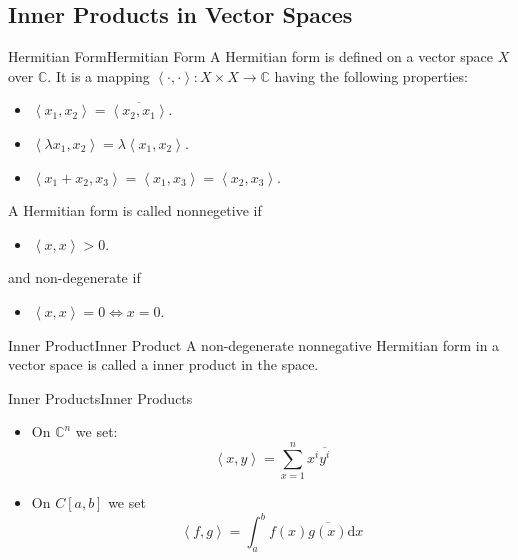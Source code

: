 \documentclass[../main.tex]{subfiles}
\begin{document}
\subsection{Inner Products in Vector Spaces}

\begin{definition}{Hermitian Form}{Hermitian Form}
A Hermitian form is defined on a vector space $X$ over $\mathbb{C}$. It is a mapping $\left<\cdot ,\cdot \right>: X \times X \rightarrow  \mathbb{C}$ having the following properties:
\begin{itemize}
\item $\left<x_1,x_2\right> = \overline{\left<x_2,x_1\right>}$.
\item $\left<\lambda x_1,x_2\right> = \lambda \left<x_1,x_2\right>$.
\item $\left<x_1+x_2,x_3\right> = \left<x_1,x_3\right> = \left<x_2,x_3\right>$.
\end{itemize}

A Hermitian form is called nonnegetive if
\begin{itemize}
\item $\left<x,x\right> >0$.
\end{itemize}
and non-degenerate if
\begin{itemize}
\item $\left<x,x\right> = 0 \Leftrightarrow x=0$.
\end{itemize}
\end{definition}

\begin{definition}{Inner Product}{Inner Product}
A non-degenerate nonnegative Hermitian form in a vector space is called a inner product in the space.
\end{definition}

\begin{example}{Inner Products}{Inner Products}
\begin{itemize}
\item On $\mathbb{C}^{n}$ we set:
	\begin{equation*}
		\left<x,y\right> = \sum_{x=1}^{n} x^i \overline{y^i}
	\end{equation*}
\item On $C[a,b]$ we set
	\begin{equation*}
	\left<f,g\right> = \int _a^b f(x) \overline{g(x)} \mathrm{d}x
	\end{equation*}
\end{itemize}
\end{example}
\end{document}
